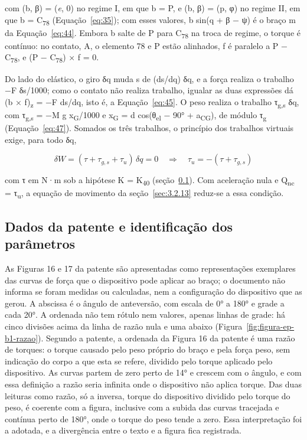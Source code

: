 com (b, β) = (\textit{e}, 0) no regime I, em que b = P, e (b, β) = (p, φ) no regime II, em que b = C\textsubscript{78} (Equação~\eqref{eq:35}); com esses valores, b sin(q + β − ψ) é o braço m da Equação~\eqref{eq:44}. Embora b salte de P para C\textsubscript{78} na troca de regime, o torque é contínuo: no contato, A, o elemento 78 e P estão alinhados, f é paralelo a P − C\textsubscript{78}, e (P − C\textsubscript{78}) × f = 0.

Do lado do elástico, o giro δq muda s de (ds/dq) δq, e a força realiza o trabalho −F δs/1000; como o contato não realiza trabalho, igualar as duas expressões dá (b × f)\textsubscript{z} = −F ds/dq, isto é, a Equação~\eqref{eq:45}. O peso realiza o trabalho τ\textsubscript{g,s} δq, com τ\textsubscript{g,s} = −M g x\textsubscript{G}/1000 e x\textsubscript{G} = d cos(θ\textsubscript{el} − 90° + a\textsubscript{CG}), de módulo τ\textsubscript{g} (Equação~\eqref{eq:47}). Somados os três trabalhos, o princípio dos trabalhos virtuais exige, para todo δq,

\begin{equation}
  \delta W = (\tau + \tau_{g,s} + \tau_{u})\,\delta q = 0\quad \Rightarrow \quad\tau_{u} = - (\tau + \tau_{g,s})
  \label{eq:49}
\end{equation}

com τ em N·m sob a hipótese K = K\textsubscript{40} (seção~\ref{sec:3.2.10}). Com aceleração nula e Q\textsubscript{nc} = τ\textsubscript{u}, a equação de movimento da seção~\ref{sec:3.2.13} reduz-se a essa condição.

\subsection{Dados da patente e identificação dos parâmetros}\label{sec:3.2.10}

As Figuras 16 e 17 da patente são apresentadas como representações exemplares das curvas de força que o dispositivo pode aplicar ao braço; o documento não informa se foram medidas ou calculadas, nem a configuração do dispositivo que as gerou. A abscissa é o ângulo de anteversão, com escala de 0° a 180° e grade a cada 20°. A ordenada não tem rótulo nem valores, apenas linhas de grade: há cinco divisões acima da linha de razão nula e uma abaixo (Figura~\ref{fig:figura-ep-b1-razao}). Segundo a patente, a ordenada da Figura 16 da patente é uma razão de torques: o torque causado pelo peso próprio do braço e pela força peso, sem indicação do corpo a que esta se refere, dividido pelo torque aplicado pelo dispositivo. As curvas partem de zero perto de 14° e crescem com o ângulo, e com essa definição a razão seria infinita onde o dispositivo não aplica torque. Das duas leituras como razão, só a inversa, torque do dispositivo dividido pelo torque do peso, é coerente com a figura, inclusive com a subida das curvas tracejada e contínua perto de 180°, onde o torque do peso tende a zero. Essa interpretação foi a adotada, e a divergência entre o texto e a figura fica registrada.

